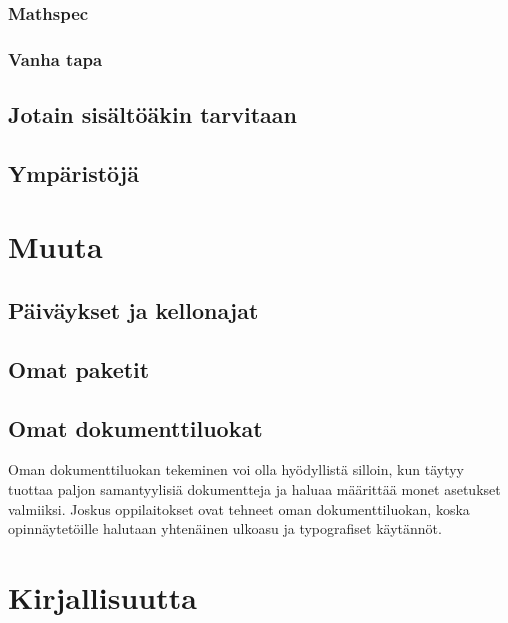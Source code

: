 \documentclass{book}
\begin{document}
\subsection{Mathspec}
\subsection{Vanha tapa}
\section{Jotain sisältöäkin tarvitaan}
\section{Ympäristöjä}

\chapter{Muuta}
\section{Päiväykset ja kellonajat}
\section{Omat paketit}
\section{Omat dokumenttiluokat}
\label{luku:omat_dokumenttiluokat}

Oman dokumenttiluokan tekeminen voi olla hyödyllistä silloin, kun täytyy
tuottaa paljon samantyylisiä dokumentteja ja haluaa määrittää monet
asetukset valmiiksi. Joskus oppilaitokset ovat tehneet oman
dokumenttiluokan, koska opinnäytetöille halutaan yhtenäinen ulkoasu ja
typografiset käytännöt.

\backmatter
\chapter{Kirjallisuutta}
\end{document}
